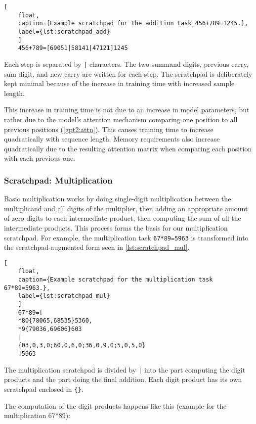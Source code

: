 \begin{lstlisting}[
	float,
	caption={Example scratchpad for the addition task 456+789=1245.},
	label={lst:scratchpad_add}
	]
	456+789=[69051|58141|47121]1245
\end{lstlisting}

Each step is separated by \verb!|! characters. The two summand digits, previous carry, sum digit, and new carry are written for each step.
The scratchpad is deliberately kept minimal because of the increase in training time with increased sample length.

\label{training_time_growth}
This increase in training time is not due to an increase in model parameters, but rather due to the model's attention mechanism comparing one position to all previous positions (\cref{gpt2:attn}). This causes training time to increase quadratically with sequence length. Memory requirements also increase quadratically due to the resulting attention matrix when comparing each position with each previous one.

\FloatBarrier
\subsubsection{Scratchpad: Multiplication}
\label{mul_scratchpad}

Basic multiplication works by doing single-digit multiplication between the multiplicand and all digits of the multiplier, then adding an appropriate amount of zero digits to each intermediate product, then computing the sum of all the intermediate products. This process forms the basis for our multiplication scratchpad. For example, the multiplication task \verb!67*89=5963!
is transformed into the scratchpad-augmented form seen in \cref{lst:scratchpad_mul}.

\begin{lstlisting}[
	float,
	caption={Example scratchpad for the multiplication task 67*89=5963.},
	label={lst:scratchpad_mul}
	]
	67*89=[
	*80{78065,68535}5360,
	*9{79036,69606}603
	|
	{03,0,3,0;60,0,6,0;36,0,9,0;5,0,5,0}
	]5963
\end{lstlisting}

\noindent
The multiplication scratchpad is divided by \verb!|! into the part computing the digit products and the part doing the final addition.
Each digit product has its own scratchpad enclosed in \verb!{}!.

The computation of the digit products happens like this (example for the multiplication 67*89):

